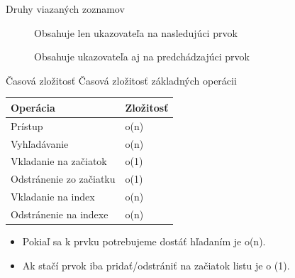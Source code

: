 \documentclass[10pt,xcolor=pdflatex,hyperref={unicode}]{beamer}
\begin{document}
\begin{frame}[fragile]{Druhy viazaných zoznamov}
	\begin{figure}[h]
		\caption{Obsahuje len ukazovateľa na nasledujúci prvok}
	\end{figure}
	\begin{figure}[h]
		\centering
		\caption{Obsahuje ukazovateľa aj na predchádzajúci prvok }
	\end{figure}
\end{frame}

\begin{frame}{Časová zložitosť}
\centering
	{\color{keyword}Časová zložitosť} základných operácii  \\

\begin{center}

    \begin{tabular}[center]{ll}
		\toprule
		Operácia  & Zložitosť \\
		\midrule
		Prístup & o(n)\\
		Vyhľadávanie & o(n)\\
		Vkladanie na začiatok & o(1)\\
		Odstránenie zo začiatku & o(1)\\
		Vkladanie na index & o(n)\\
		Odstránenie na indexe & o(n)\\
		\bottomrule
	\end{tabular}
\end{center}
\centering
\begin{itemize}
    \item Pokiaľ sa k prvku potrebujeme dostáť hľadaním je o(n).
    \item Ak stačí prvok iba pridať/odstrániť  na začiatok listu je o (1). 
\end{itemize}
\end {frame}
\end{document}
